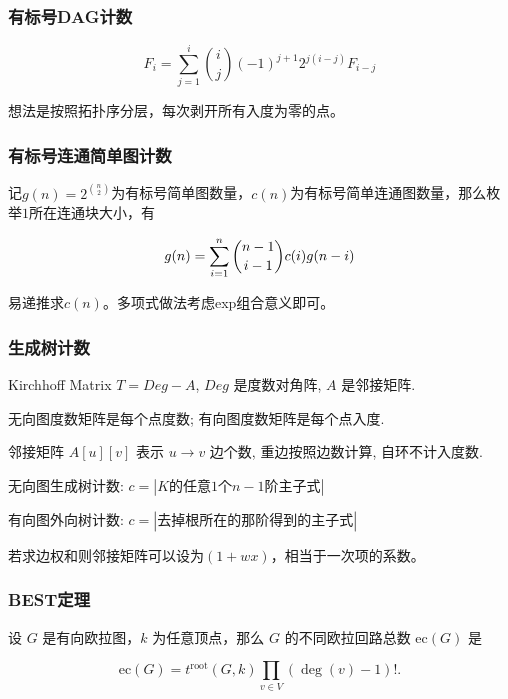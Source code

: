 \documentclass[twoside]{article}
\begin{document}
\subsubsection{有标号DAG计数}

$$
F_i=\sum_{j=1}^i \binom{i}{j}(-1)^{j+1}2^{j(i-j)}F_{i-j}
$$

想法是按照拓扑序分层，每次剥开所有入度为零的点。

\subsubsection{有标号连通简单图计数}

记$g(n)=2^{\binom n2}$为有标号简单图数量，$c(n)$为有标号简单连通图数量，那么枚举$1$所在连通块大小，有

$$
g(n) = \sum_{i=1}^n \dbinom{n-1}{i-1}c(i)g(n-i)
$$

易递推求$c(n)$。多项式做法考虑exp组合意义即可。

\subsubsection{生成树计数}
Kirchhoff Matrix $T = Deg - A$, $Deg$ 是度数对角阵, $A$ 是邻接矩阵. 

无向图度数矩阵是每个点度数; 有向图度数矩阵是每个点入度.

邻接矩阵 $A[u][v]$ 表示 $u \to v$ 边个数, 重边按照边数计算, 自环不计入度数.

无向图生成树计数: $c = |K的任意1个 n-1 阶主子式|$

有向图外向树计数: $c = |去掉根所在的那阶得到的主子式|$

若求边权和则邻接矩阵可以设为$(1+wx)$，相当于一次项的系数。

\subsubsection{BEST定理}
设 $G$ 是有向欧拉图，$k$ 为任意顶点，那么 $G$ 的不同欧拉回路总数 $\mathrm{ec}(G)$ 是

$$
\mathrm{ec}(G) = t^\mathrm{root}(G,k)\prod_{v\in V}(\deg (v) - 1)!.
$$
\end{document}
